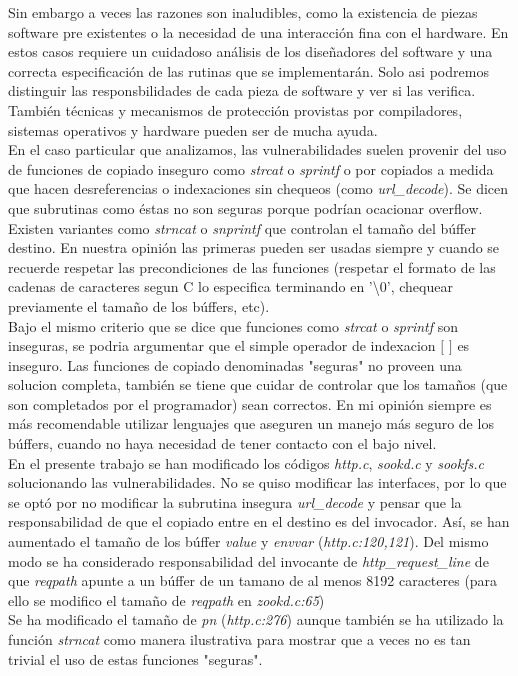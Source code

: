 \documentclass[12pt]{article}
\begin{document}
Sin embargo a veces las razones son inaludibles, como la existencia de piezas software pre existentes o la necesidad de una interacción fina con el hardware. En estos casos requiere un cuidadoso análisis de los diseñadores del software y una correcta especificación de las rutinas que se implementarán. Solo asi podremos distinguir las responsbilidades de cada pieza de software y ver si las verifica. También técnicas y mecanismos de protección provistas por compiladores, sistemas operativos y hardware pueden ser de mucha ayuda. \\

En el caso particular que analizamos, las vulnerabilidades suelen provenir del uso de funciones de copiado inseguro como \textit{strcat} o \textit{sprintf} o por copiados a medida que hacen desreferencias o indexaciones sin chequeos (como \textit{url\_decode}). Se dicen que subrutinas como éstas no son seguras porque podrían ocacionar overflow. Existen variantes como  \textit{strncat} o  \textit{snprintf} que controlan el tamaño del búffer destino. En nuestra opinión las primeras pueden ser usadas siempre y cuando se recuerde respetar las precondiciones de las funciones (respetar el formato de las cadenas de caracteres segun C lo especifica terminando en '\textbackslash 0', chequear previamente el tamaño de los búffers, etc). \\

Bajo el mismo criterio que se dice que funciones como \textit{strcat} o \textit{sprintf} son inseguras, se podria argumentar que el simple operador de indexacion $[$ $]$ es inseguro. Las funciones de copiado denominadas "seguras" no proveen una solucion completa, también se tiene que cuidar de controlar que los tamaños (que son completados por el programador) sean correctos. En mi opinión siempre es más recomendable utilizar lenguajes que aseguren un manejo más seguro de los búffers, cuando no haya necesidad de tener contacto con el bajo nivel. \\

En el presente trabajo se han modificado los códigos \textit{http.c}, \textit{sookd.c} y \textit{sookfs.c} solucionando las vulnerabilidades. No se quiso modificar las interfaces, por lo que se optó por no modificar la subrutina insegura \textit{url\_decode} y pensar que la responsabilidad de que el copiado entre en el destino es del invocador. Así, se han aumentado el tamaño de los búffer \textit{value} y \textit{envvar} (\textit{http.c:120,121}). Del mismo modo se ha considerado responsabilidad del invocante de \textit{http\_request\_line} de que \textit{reqpath} apunte a un búffer de un tamano de al menos 8192 caracteres (para ello se modifico el tamaño de \textit{reqpath} en \textit{zookd.c:65}) \\
Se ha modificado el tamaño de \textit{pn} (\textit{http.c:276}) aunque también se ha utilizado la función \textit{strncat} como manera ilustrativa para mostrar que a veces no es tan trivial el uso de estas funciones "seguras".\\
\end{document}
